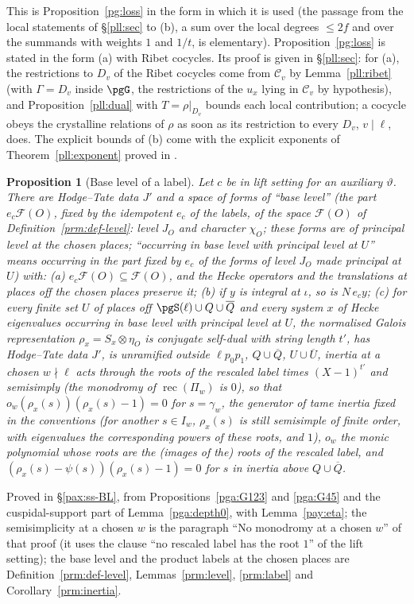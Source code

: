 \documentclass[10pt]{amsart}
\newtheorem{proposition}[theorem]{Proposition}
\theoremstyle{definition}
\theoremstyle{remark}
\begin{document}
This is Proposition~\ref{pg:loss} in the form in which it is used (the passage from the local
statements of \S\ref{pll:sec} to (b), a sum over the local degrees $\le2f$ and over the summands with
weights $1$ and $1/t$, is elementary). Proposition~\ref{pg:loss} is stated in the form (a) with Ribet
cocycles. Its proof is given in \S\ref{pll:sec}: for (a), the restrictions to $D_v$ of the Ribet
cocycles come from $\mathcal C_v$ by Lemma~\ref{pll:ribet} (with $\Gamma=D_v$ inside $\pgG$, the
restrictions of the $u_x$ lying in $\mathcal C_v$ by hypothesis), and Proposition~\ref{pll:dual}
with $T=\rho|_{D_v}$ bounds each local contribution; a cocycle obeys the crystalline relations of
$\rho$ as soon as its restriction to every $D_v$, $v\mid\ell$, does. The explicit bounds of (b) come with the explicit exponents of
Theorem~\ref{pll:exponent} proved in {\cite[\S2.3]{P56}}.

\begin{proposition}[Base level of a label]\label{pri:BL}
Let $c$ be in lift setting for an auxiliary $\vartheta$. There are Hodge--Tate data $J'$ and a
space of forms of ``base level'' (the part $e_c\mathcal F(O)$, fixed by the idempotent $e_c$ of the labels, of the space $\mathcal F(O)$ of Definition~\ref{prm:def-level}: level
$J_O$ and character $\chi_O$; these forms are of principal level at the chosen places; ``occurring in base level with principal level at $U$'' means occurring in the part fixed by $e_c$ of the forms of level $J_O$ made principal at $U$) with: (a) $e_c\mathcal F(O)\subseteq\mathcal F(O)$, and the Hecke operators and the translations at places off the chosen places preserve it; (b) if
$y$ is integral at $\iota$, so is $N\,e_cy$; (c) for every finite set $U$ of places off
$\pgS(\ell)\cup Q\cup\overline Q$ and every system $x$ of Hecke eigenvalues occurring in base level
with principal level at $U$, the normalised Galois representation $\rho_x=S_x\otimes\eta_O$ is
conjugate self-dual with string length $t'$, has Hodge--Tate data $J'$, is unramified outside $\ell
p_0p_1$, $Q\cup\overline Q$, $U\cup\overline U$, inertia at a chosen $w\nmid\ell$ acts through the roots of
the rescaled label times $(X-1)^{t'}$ and semisimply (the monodromy of $\operatorname{rec}(\Pi_w)$
is $0$), so that $o_w(\rho_x(s))(\rho_x(s)-1)=0$ for $s=\gamma_w$, the generator of tame inertia fixed in the conventions (for another $s\in I_w$, $\rho_x(s)$ is still semisimple of finite order, with eigenvalues the corresponding powers of these roots, and $1$), $o_w$ the monic polynomial whose
roots are the (images of the) roots of the rescaled label, and $(\rho_x(s)-\psi(s))(\rho_x(s)-1)=0$
for $s$ in inertia above $Q\cup\overline Q$.
\end{proposition}
\noindent Proved in \S\ref{pax:ss-BL}, from Propositions~\ref{pga:G123} and \ref{pga:G45} and the
cuspidal-support part of Lemma~\ref{pga:depth0}, with Lemma~\ref{pay:eta}; the semisimplicity at a
chosen $w$ is the paragraph ``No monodromy at a chosen $w$'' of that proof (it uses the clause ``no
rescaled label has the root $1$'' of the lift setting); the base level and the
product labels at the chosen places are Definition~\ref{prm:def-level}, Lemmas~\ref{prm:level},
\ref{prm:label} and Corollary~\ref{prm:inertia}.\par\smallskip
\end{document}
